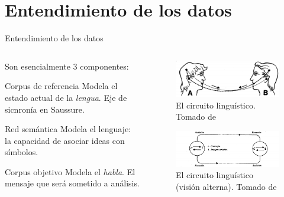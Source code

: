 \documentclass[presentation]{beamer}
\begin{document}
\section{Entendimiento de los datos}
\label{sec:org4072b42}
\begin{frame}[label={sec:orgdb32106}]{Entendimiento de los datos}
\begin{columns}
\begin{column}{0.48\columnwidth}
Son esencialmente 3 componentes:

\begin{block}{Corpus de referencia}
Modela el estado actual de la \emph{lengua}.
Eje de sicnronía en Saussure.
\end{block}

\begin{block}{Red semántica}
 Modela el lenguaje: la capacidad de asociar ideas con símbolos.
\end{block}

\begin{block}{Corpus objetivo}
 Modela el \emph{habla}. El mensaje que será sometido a análisis.
\end{block}
\end{column}



\begin{column}{0.48\columnwidth}
\begin{figure}
\includegraphics[width=\textwidth]{./assets/sistema-comunicacion.png}
\caption{El circuito linguístico. Tomado de \cite{alonso1945curso}}
\end{figure}

   \begin{figure}

   \includegraphics[width=\textwidth]{./assets/sistema-comunicacion2.png}
\caption{El circuito linguístico (visión alterna). Tomado de \cite{alonso1945curso}}
   \end{figure}
\end{column}
\end{columns}
\end{frame}
\end{document}
